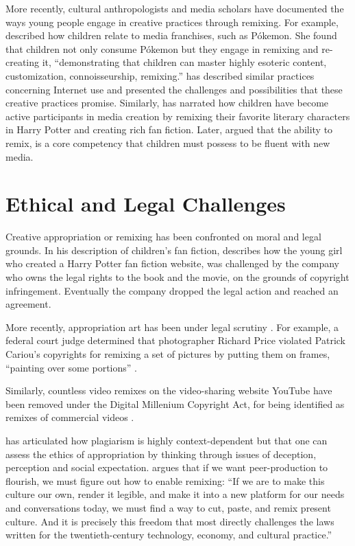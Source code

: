 More recently, cultural anthropologists and media scholars have documented the ways young people engage in creative practices through remixing. 
For example, \citet{ito_technologies_2007} described how children relate to media franchises, such as Pókemon.
She found that children not only consume Pókemon but they engage in remixing and re-creating it, ``demonstrating that children can master highly esoteric content, customization, connoisseurship, remixing.''
\citet{livingstone_taking_2008} has described similar practices concerning Internet use and presented the challenges and possibilities that these creative practices promise.
Similarly, \citet{jenkins_convergence_2006} has narrated how children have become active participants in media creation by remixing their favorite literary characters in Harry Potter and creating rich fan fiction.
Later, \citet{jenkins_confronting_2009} argued that the ability to remix, is a core competency that children must possess to be fluent with new media.

\section{Ethical and Legal Challenges}

Creative appropriation or remixing has been confronted on moral and legal grounds.
In his description of children's fan fiction, \citet{jenkins_convergence_2006} describes how the young girl who created a Harry Potter fan fiction website, was challenged by the company who owns the legal rights to the book and the movie, on the grounds of copyright infringement.
Eventually the company dropped the legal action and reached an agreement.

More recently, appropriation art has been under legal scrutiny \citep{greenberg_art_1992,landes_copyright_2000}. 
For example, a federal court judge determined that photographer Richard Price violated Patrick Cariou's copyrights for remixing a set of pictures by putting them on frames, ``painting over some portions'' \citep{batts_patrick_2011}.

Similarly, countless video remixes on the video-sharing website YouTube have been removed under the Digital Millenium Copyright Act, for being identified as remixes of commercial videos \citep{seneviratne_remix_2010}.

\citet{posner_little_2007} has articulated how plagiarism is highly context-dependent but that one can assess the ethics of appropriation by thinking through issues of deception, perception and social expectation.
\citet{benkler_wealth_2006} argues that if we want peer-production to flourish, we must figure out how to enable remixing:
``If we are to make this culture our own, render it legible, and make it into a new platform for our needs and conversations today, we must find a way to cut, paste, and remix present culture. And it is precisely this freedom that most directly challenges the laws written for the twentieth-century technology, economy, and cultural practice.''

